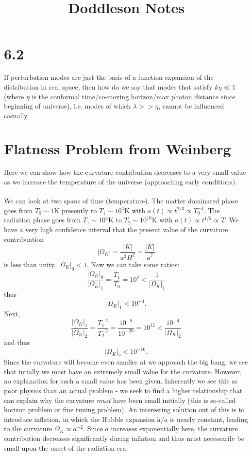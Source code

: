 \documentclass[10pt,letterpaper]{article}
\title{Doddleson Notes}
\date{}
\begin{document}
\maketitle
\section*{6.2}
If perturbation modes are just the basis of a function expansion of the distribution in real space, then how do we say that modes that satisfy $k\eta \ll 1$ (where $\eta$ is the conformal time/co-moving horizon/max photon distance since beginning of universe), i.e. modes of which $\lambda >> \eta$, cannot be influenced casually. 

\section*{Flatness Problem from Weinberg}
Here we can show how the curvature contribution decreases to a very small value as we increase the temperature of the universe (approaching early conditions).
\\ \\
We can look at two spans of time (temperature). The matter dominated phase goes from $T_0\sim 1$K presently to $T_1 \sim 10^4$K with $a(t) \propto t^{2/3} \propto T_0^{-1}$. The radiation phase goes from $T_1 \sim 10^4$K to $T _2\sim 10^{10}$K with $a(t) \propto t^{1/2} \propto T$. We have a very high confidence interval that the present value of the curvature contribuation
\[
	|\Omega_K| = \frac{|K|}{a^2 H^2} = \frac{|K|}{\dot a^2}
\]
is less than unity, $|\Omega_K|_0 < 1$. Now we can take some ratios:
\[
	\frac{|\Omega_{K}|_0}{|\Omega_K|_1} = \frac{T_1}{T_0} = 10^4 < \frac{1}{|\Omega_K|_1}
\]
thus
\[
	|\Omega_K|_1 < 10^{-4}.
\] 
Next, 
\[
	\frac{|\Omega_{K}|_1}{|\Omega_K|_2} = \frac{T_1^{-2}}{T_2^{-2}} = \frac{10^{-8}}{10^{-20}}   = 10^{12} < \frac{10^{-4}}{|\Omega_K|_2}
\]
and thus
\[
	|\Omega_K|_2 < 10^{-16}.
\]
Since the curvature will become even smaller at we approach the big bang, we see that intially we must have an extremely small value for the curvature. However, no explanation for such a small value has been given. Inherently we see this as poor physics than an actual problem - we seek to find a higher relationship that can explain why the curvature \emph{must} have been small initially (this is so-called horizon problem or fine tuning problem). An interesting solution out of this is to introduce inflation, in which the Hubble expansion $\dot a/a$ is nearly constant, leading to the curvature $\Omega_K \propto a^{-2}$. Since $a$ increases exponentially here, the curvature contribution decreases significantly during inflation and thus must necessarily be small upon the onset of the radiation era. 
\end{document}
